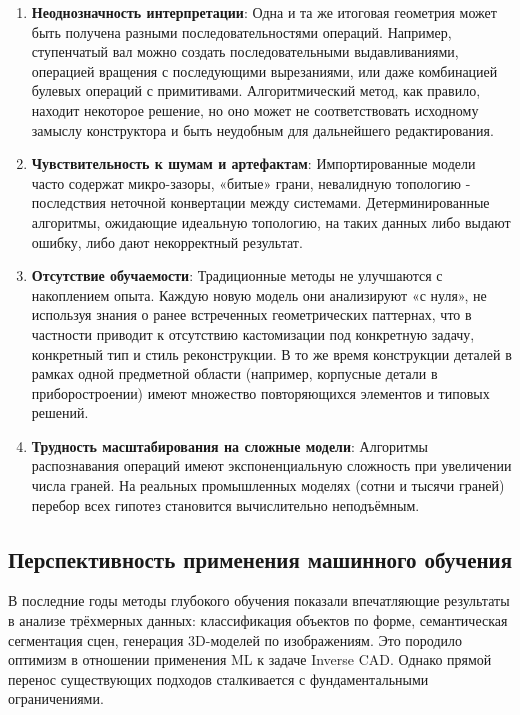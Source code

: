 \begin{enumerate}
    \item \textbf{Неоднозначность интерпретации}: Одна и та же итоговая геометрия может быть получена разными последовательностями операций. Например, ступенчатый вал можно создать последовательными выдавливаниями, операцией вращения с последующими вырезаниями, или даже комбинацией булевых операций с примитивами. Алгоритмический метод, как правило, находит некоторое решение, но оно может не соответствовать исходному замыслу конструктора и быть неудобным для дальнейшего редактирования.

    \item \textbf{Чувствительность к шумам и артефактам}: Импортированные модели часто содержат микро-зазоры, «битые» грани, невалидную топологию - последствия неточной конвертации между системами. Детерминированные алгоритмы, ожидающие идеальную топологию, на таких данных либо выдают ошибку, либо дают некорректный результат.

    \item \textbf{Отсутствие обучаемости}: Традиционные методы не улучшаются с накоплением опыта. Каждую новую модель они анализируют «с нуля», не используя знания о ранее встреченных геометрических паттернах, что в частности приводит к отсутствию кастомизации под конкретную задачу, конкретный тип и стиль реконструкции. В то же время конструкции деталей в рамках одной предметной области (например, корпусные детали в приборостроении) имеют множество повторяющихся элементов и типовых решений.

    \item \textbf{Трудность масштабирования на сложные модели}: Алгоритмы распознавания операций имеют экспоненциальную сложность при увеличении числа граней. На реальных промышленных моделях (сотни и тысячи граней) перебор всех гипотез становится вычислительно неподъёмным.
\end{enumerate}

\subsection{Перспективность применения машинного обучения}

В последние годы методы глубокого обучения показали впечатляющие результаты в анализе трёхмерных данных: классификация объектов по форме, семантическая сегментация сцен, генерация 3D-моделей по изображениям. Это породило оптимизм в отношении применения ML к задаче Inverse CAD. Однако прямой перенос существующих подходов сталкивается с фундаментальными ограничениями.

